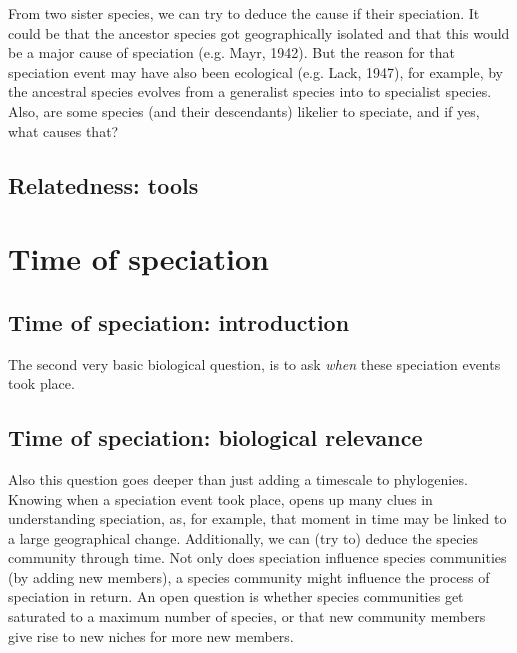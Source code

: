 From two sister species, we can try to deduce the cause
if their speciation. It could be that the ancestor species
got geographically isolated and that this would be a major
cause of speciation (e.g. Mayr, 1942). But the reason for
that speciation event may have also been ecological (e.g. Lack, 1947),
for example, by the ancestral species evolves from a generalist
species into to specialist species. Also, are some species (and their
descendants) likelier to speciate, and if yes, what causes that?

\subsection{Relatedness: tools}


\section{Time of speciation}

\subsection{Time of speciation: introduction}

The second very basic biological question, is to 
ask \emph{when} these speciation events took place.

\subsection{Time of speciation: biological relevance}

Also this question goes deeper than just 
adding a timescale to phylogenies.
Knowing when a speciation event took place,
opens up many clues in understanding speciation, as,
for example, that moment in time may be linked to a large geographical change.
Additionally, we can (try to) deduce the species community through time.
Not only does speciation influence species communities (by adding
new members), a species community might influence the process of speciation
in return. An open question is whether species communities get
saturated to a maximum number of species, or that new community members
give rise to new niches for more new members.

